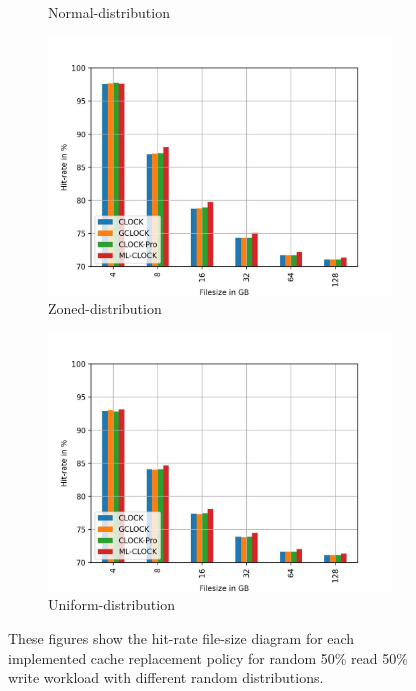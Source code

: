 \documentclass[
	12pt,
	a4paper,
	abstract,
	bibliography=totoc,
	chapterprefix,
	headings=openright,
	numbers=endperiod,
	parskip=half,
	twoside,
]{scrreprt}
\begin{document}
\begin{figure}[H]
\begin{subfigure}{0.4\textwidth}
		\caption{Normal-distribution}
		\label{fig:rw_90to10  normal}
	\end{subfigure}
	\hfill
	\begin{subfigure}{0.4\textwidth}
		\includegraphics[width=\textwidth]{rw_50to50_zoned.jpg}		
		\caption{Zoned-distribution}
		\label{fig:rw_90to10  zoned}
	\end{subfigure}
	\hfill
	\begin{subfigure}{0.4\textwidth}
		\includegraphics[width=\textwidth]{rw_50to50_uniform.jpg}		
		\caption{Uniform-distribution}
		\label{fig:rw_90to10  uniform}
	\end{subfigure}
	\caption{These figures show the hit-rate file-size diagram for each implemented 		cache replacement policy for random 50\% read 50\% write workload with different random distributions.}
	\label{fig:single 50p read}
\end{figure}
\end{document}
